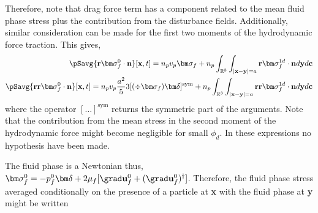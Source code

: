 Therefore, note that drag force term has a component related to the mean fluid phase stress plus the contribution from the disturbance fields. 
Additionally, similar consideration can be made for the first two moments of the hydrodynamic force traction. 
This gives, 
\begin{align}
    \pSavg{\textbf{r}\bm\sigma_f^0\cdot\textbf{n}}[\textbf{x},t]
    =
    n_p v_p \bm\sigma_f
    +
    n_p 
    \int_{\mathbb{R}^3}
    \int_{|\textbf{x}-\textbf{y}|=a}
    \textbf{r}\bm\sigma_f^{1d} \cdot \textbf{n}
    d\textbf{y}
    d\textbf{c}
    \\
    \pSavg{\textbf{rr}\bm\sigma_f^0\cdot\textbf{n}}[\textbf{x},t]
    =
    n_pv_p  \frac{a^2}{5} 3 [(\div \bm\sigma_f)\bm\delta]^\text{sym}
    +
    n_p 
    \int_{\mathbb{R}^3}
    \int_{|\textbf{x}-\textbf{y}|=a}
    \textbf{rr}\bm\sigma_f^{1d} \cdot \textbf{n}
    d\textbf{y}
    d\textbf{c}
    \\
\end{align}
where the operator $[\ldots]^\text{sym}$ returns the symmetric part of the arguments.
Note that the contribution from the mean stress in the second moment of the hydrodynamic force might become negligible for small $\phi_d$. 
In these expressions no hypothesis have been made. 


The fluid phase is a Newtonian thus, $\bm\sigma_f^0 = - p_f^0\bm\delta + 2\mu_f [\grad \textbf{u}_f^0 + (\grad \textbf{u}_f^0)^\dagger]$.
Therefore, the fluid phase stress averaged conditionally on the presence of a particle at \textbf{x} with the fluid phase at \textbf{y} might be written


